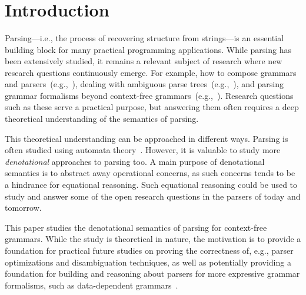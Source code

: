 \begin{code}[hide]%
\>[0]\AgdaSpace{}%
\AgdaSpace{}%
\<%
\\
%
\\[\AgdaEmptyExtraSkip]%
\>[0]\AgdaSpace{}%
\AgdaSpace{}%
\<%
\\
\>[0]\<%
\end{code}

\section{Introduction}

Parsing---i.e., the process of recovering structure from strings---is an essential building block for many practical programming applications.
While parsing has been extensively studied, it remains a relevant subject of research where new research questions continuously emerge.
For example, how to compose grammars and parsers~(e.g.,~\cite{SchwerdfegerW09}), dealing with ambiguous parse trees~(e.g.,~\cite{BrabrandGM10,basten-thesis,vinju-evcs}), and parsing grammar formalisms beyond context-free grammars~(e.g.,~\cite{one-parser-to-rule-them-all}).
Research questions such as these serve a practical purpose, but answering them often requires a deep theoretical understanding of the semantics of parsing.

This theoretical understanding can be approached in different ways.
Parsing is often studied using automata theory~\cite{hopcroft-book}.
However, it is valuable to study more \emph{denotational} approaches to parsing too.
A main purpose of denotational semantics is to abstract away operational concerns, as such concerns tends to be a hindrance for equational reasoning.
Such equational reasoning could be used to study and answer some of the open research questions in the parsers of today and tomorrow.

This paper studies the denotational semantics of parsing for context-free grammars.
While the study is theoretical in nature, the motivation is to provide a foundation for practical future studies on proving the correctness of, e.g., parser optimizations and disambiguation techniques, as well as potentially providing a foundation for building and reasoning about parsers for more expressive grammar formalisms, such as data-dependent grammars~\cite{one-parser-to-rule-them-all}.

